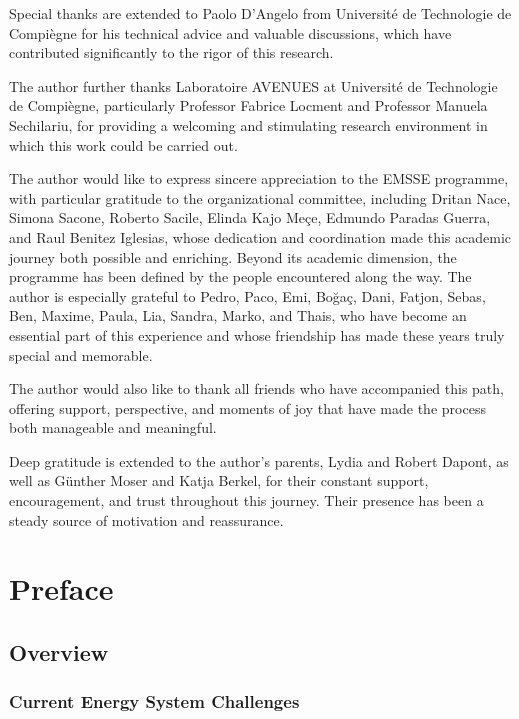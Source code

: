\documentclass[12pt,a4paper]{report}
\begin{document}
Special thanks are extended to Paolo D’Angelo from Université de Technologie de Compiègne for his technical advice and valuable discussions, which have contributed significantly to the rigor of this research.

The author further thanks Laboratoire AVENUES at Université de Technologie de Compiègne, particularly Professor Fabrice Locment and Professor Manuela Sechilariu, for providing a welcoming and stimulating research environment in which this work could be carried out.

The author would like to express sincere appreciation to the EMSSE programme, with particular gratitude to the organizational committee, including Dritan Nace, Simona Sacone, Roberto Sacile, Elinda Kajo Me\c{c}e, Edmundo Paradas Guerra, and Raul Benitez Iglesias, whose dedication and coordination made this academic journey both possible and enriching. Beyond its academic dimension, the programme has been defined by the people encountered along the way. The author is especially grateful to Pedro, Paco, Emi, Bo\u{g}a\c{c}, Dani, Fatjon, Sebas, Ben, Maxime, Paula, Lia, Sandra, Marko, and Thais, who have become an essential part of this experience and whose friendship has made these years truly special and memorable.

The author would also like to thank all friends who have accompanied this path, offering support, perspective, and moments of joy that have made the process both manageable and meaningful.

Deep gratitude is extended to the author’s parents, Lydia and Robert Dapont, as well as Günther Moser and Katja Berkel, for their constant support, encouragement, and trust throughout this journey. Their presence has been a steady source of motivation and reassurance.

\newpage
\tableofcontents

\chapter{Preface}
\setcounter{page}{1}

\section{Overview}

\subsection{Current Energy System Challenges}
\end{document}
